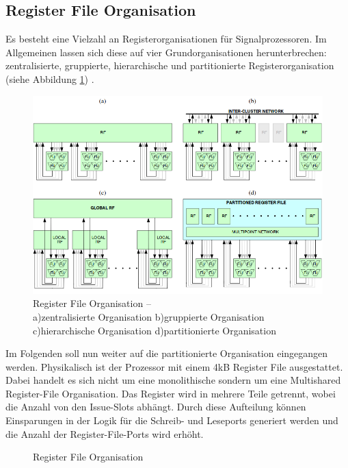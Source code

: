 \subsection{Register File Organisation}
Es besteht eine Vielzahl an Registerorganisationen für Signalprozessoren. Im Allgemeinen lassen sich diese auf vier Grundorganisationen herunterbrechen: zentralisierte, gruppierte, hierarchische und partitionierte Registerorganisation (siehe Abbildung \ref{fig:RegisterOrga}) \cite{paya2010multi}.\newline
\begin{figure}[htbp] 
	\centering
	\includegraphics[width=\textwidth]{fig/Register_orga.png}
	\caption[Register File Organisation]{Register File Organisation –\\ a)zentralisierte Organisation b)gruppierte Organisation c)hierarchische Organisation d)partitionierte Organisation  \cite{paya2010multi}}
	\label{fig:RegisterOrga}
\end{figure}
\newline
Im Folgenden soll nun weiter auf die partitionierte Organisation eingegangen werden. Physikalisch ist der Prozessor mit einem 4kB Register File ausgestattet. Dabei handelt es sich nicht um eine monolithische sondern um eine Multishared Register-File Organisation. Das Register wird in mehrere Teile getrennt, wobei die Anzahl von den Issue-Slots abhängt. Durch diese Aufteilung können Einsparungen in der Logik für die Schreib- und Leseports generiert werden und die Anzahl der Register-File-Ports wird erhöht.\cite{paya2010multi}
\begin{scriptsize}
	\begin{figure}[htbp] 
		\centering
		
		\caption{Register File Organisation}
		\label{fig:reg_orga}
	\end{figure}
\end{scriptsize}

